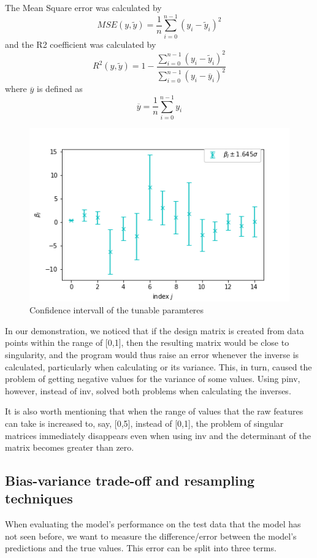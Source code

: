 \documentclass{article}
\begin{document}
The Mean Square error was calculated by
\begin{equation}\label{mse}
MSE(y,\tilde{y}) = \dfrac{1}{n}\sum_{i=0}^{n-1} (y_{i} - \tilde{y}_{i})^{2}
\end{equation}
and the R2 coefficient was calculated by
\begin{equation}\label{r2}
R^{2}(y,\tilde{y}) = 1 - \dfrac{\sum_{i=0}^{n-1} (y_{i} - \tilde{y}_{i})^{2}}{\sum_{i=0}^{n-1} (y_{i} - \overline{y}_{i})^{2}}
\end{equation}
where $\overline{y}$ is defined as
\begin{equation}
\overline{y} = \dfrac{1}{n} \sum_{i=0}^{n-1} y_{i}
\end{equation}
\begin{figure}
\includegraphics[scale=0.5]{confidenceintervall.png}
\centering
\caption{Confidence intervall of the tunable paramteres}
\label{fig:confint}
\end{figure}

In our demonstration, we noticed that if the design matrix is created from data points within the range of [0,1], then the resulting  matrix would be close to singularity, and the program would thus raise an error whenever the inverse is calculated, particularly when calculating  or its variance. This, in turn, caused the problem of getting negative values for the variance of some values. Using pinv, however, instead of inv, solved both problems when calculating the inverses.

It is also worth mentioning that when the range of values that the raw features can take is increased to, say, [0,5], instead of [0,1], the problem of singular matrices immediately disappears even when using inv and the determinant of the matrix  becomes greater than zero.

\subsection{Bias-variance trade-off and resampling techniques}
When evaluating the model’s performance on the test data that the model has not seen before, we want to measure the difference/error between the model’s predictions and the true values. This error can be split into three terms.
\end{document}
